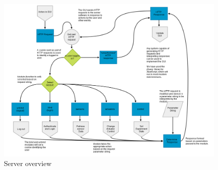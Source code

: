 \begin{figure}[H]
	\centering
	\includegraphics[width=1.0\textwidth]{figures/server_overview.png}
	\caption{Server overview} 
	\label{server_overview.png}
\end{figure}


